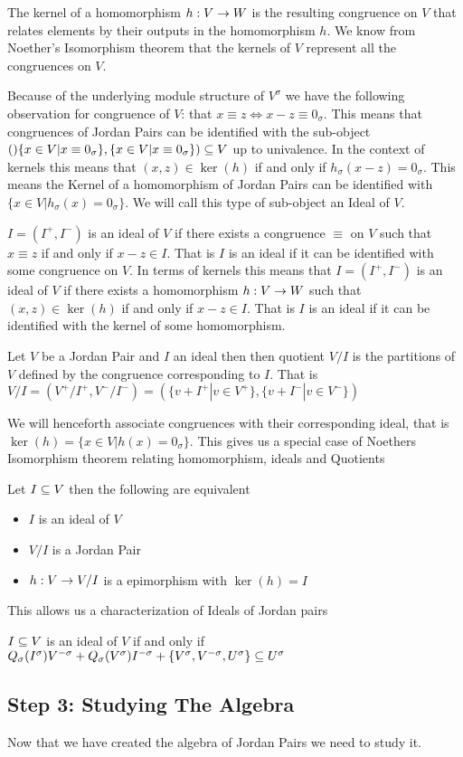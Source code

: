 The kernel of a homomorphism $h:V\rightarrow W$ is the resulting congruence on $V$ that relates elements by their outputs in the
homomorphism $h$. We know from Noether's Isomorphism theorem that the kernels of $V$ represent all the congruences on $V$.


Because of the underlying module structure of $V^\sigma$ we have the following observation for 
congruence of $V$: that $x\equiv z \Leftrightarrow x-z\equiv 0_\sigma$. 
This means that congruences of Jordan Pairs can be identified with the sub-object 
$()\{x\in V | x\equiv 0_\sigma\},\{x\in V | x\equiv 0_\sigma\})\subseteq V$ up to univalence. 
In the context of kernels this means that
$(x,z)\in\ker(h)$ if and only if $h_\sigma(x-z)=0_\sigma$.
This means the Kernel of a homomorphism of Jordan Pairs can be identified with 
$\{x\in V | h_\sigma(x)=0_\sigma\}$.
We will call this type of sub-object an Ideal of $V$.

\begin{definition}
    $I=(I^+,I^-)$ is an ideal of $V$ if there exists a congruence $\equiv$ on $V$ 
    such that $x\equiv z$ if and only if $x-z\in I$. That is $I$ is an ideal if it 
    can be identified with some congruence on $V$. 
    In terms of kernels this means that 
    $I=(I^+,I^-)$ is an ideal of $V$ if there exists a homomorphism $h: V\rightarrow W$ 
    such that $(x,z)\in \ker(h)$ if and only if $x-z\in I$. That is $I$ is an ideal if it 
    can be identified with the kernel of some homomorphism. 
\end{definition}
\begin{definition}
    Let $V$ be a Jordan Pair and $I$ an ideal then then quotient 
    $V/I$ is the partitions of $V$ defined by the congruence 
    corresponding to $I$. That is $V/I=(V^+/I^+,V^-/I^-)=(\{v+I^+|v\in V^+\},\{v+I^-|v\in V^-\})$
\end{definition}
We will henceforth associate congruences with their corresponding ideal, that is $\ker(h)=\{x\in V | h(x)=0_\sigma\}$.
This gives us a special case of Noethers Isomorphism theorem 
relating homomorphism, ideals and Quotients 
\begin{prop}
    Let $I\subseteq V$ then the following are equivalent
    \begin{itemize}
    \item $I$ is an ideal of $V$
    \item $V/I$ is a Jordan Pair
    \item $h:V\rightarrow V/I$ is a epimorphism with $\ker(h)=I$
    \end{itemize}
\end{prop}
This allows us a characterization of Ideals of Jordan pairs
\begin{prop}
$I\subseteq V$ is an ideal of $V$ if and only if $Q_\sigma(I^\sigma)V^{-\sigma}+Q_\sigma(V^\sigma)I^{-\sigma}+\{V^\sigma,V^{-\sigma},U^\sigma\}\subseteq U^\sigma$
\end{prop}

\subsection{Step 3: Studying The Algebra}
Now that we have created the algebra of Jordan Pairs we need to study it.